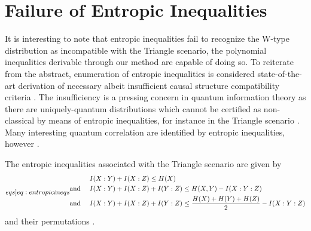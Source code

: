 \section{Failure of Entropic Inequalities}

It is interesting to note that entropic inequalities \cite{fritz2013marginal,chaves2014novel,chaves2014informationinference} fail to recognize the W-type distribution as incompatible with the Triangle scenario, the polynomial inequalities derivable through our method are capable of doing so. To reiterate from the abstract, enumeration of entropic inequalities is considered state-of-the-art derivation of necessary albeit insufficient causal structure compatibility criteria \cite{pusey2014gdag}. The insufficiency is a pressing concern in quantum information theory as there are uniquely-quantum distributions which cannot be certified as non-classical by means of entropic inequalities, for instance in the Triangle scenario \citep[Prob. 2.17]{fritz2012bell}. Many interesting quantum correlation are identified by entropic inequalities, however \cite{SchumacherInequality,chaves2012entropic}. 


The entropic inequalities associated with the Triangle scenario are given by 
\begin{align}\label[eqs]{eq:entropicineqs}\begin{split}
&I\parens{X:Y}+I\parens{X:Z}\leq H\parens{X}
\\\text{and }\quad&I\parens{X:Y}+I\parens{X:Z}+I\parens{Y:Z}\leq H\parens{X,Y}-I\parens{X:Y:Z}
\\\text{and }\quad & I\parens{X:Y}+I\parens{X:Z}+I\parens{Y:Z}\leq\frac{H\parens{X}+H\parens{Y}+H\parens{Z}}{2}-I\parens{X:Y:Z}
\end{split}\end{align}
and their permutations \cite{chaves2014novel,Chaves2015infoquantum,pusey2014gdag,steudel2010ancestors}.

